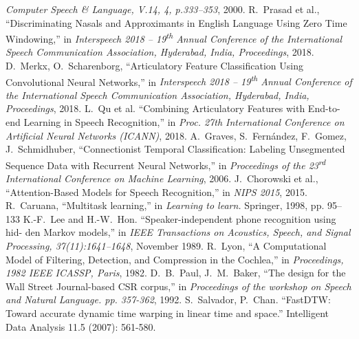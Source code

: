 \documentclass[a4paper]{article}
\begin{document}
\begin{thebibliography}{9}
   \textit{Computer Speech \& Language, V.14, 4, p.333--353}, 2000.
   R.\ Prasad et al.,
   ``Discriminating Nasals and Approximants in English Language Using Zero Time Windowing,''
   in \textit{Interspeech 2018 -- 19\textsuperscript{th} Annual Conference of the International Speech Communication Association, Hyderabad, India, Proceedings}, 2018.
    D.\ Merkx, O.\ Scharenborg,
    ``Articulatory Feature Classification Using Convolutional Neural Networks,''
    in \textit{Interspeech 2018 -- 19\textsuperscript{th} Annual Conference of the International Speech Communication Association, Hyderabad, India, Proceedings}, 2018.
   L.\ Qu et al.
   ``Combining Articulatory Features with End-to-end Learning in Speech Recognition,''
   in \textit{Proc. 27th International Conference on Artificial Neural Networks (ICANN)}, 2018.
   A.\ Graves, S.\ Fernández, F.\ Gomez, J.\ Schmidhuber,
   ``Connectionist Temporal Classification: Labeling Unsegmented Sequence Data with Recurrent Neural Networks,''
   in \textit{Proceedings of the 23\textsuperscript{rd} International Conference on Machine Learning}, 2006.
   J.\ Chorowski et al.,
   ``Attention-Based Models for Speech Recognition,''
   in \textit{NIPS 2015}, 2015.
   R.\ Caruana,
   ``Multitask learning,''
   in \textit{Learning to learn.} Springer, 1998, pp. 95–133
   K.-F.\ Lee and H.-W.\ Hon.
   ``Speaker-independent phone recognition using hid- den Markov models,''
   in \textit{IEEE Transactions on Acoustics, Speech, and Signal Processing, 37(11):1641–1648}, November 1989.
   R.\ Lyon,
   ``A Computational Model of Filtering, Detection, and Compression in the Cochlea,''
   in \textit{Proceedings, 1982 IEEE ICASSP, Paris}, 1982.
   D.\ B.\ Paul, J.\ M.\ Baker,
   ``The design for the Wall Street Journal-based CSR corpus,''
   in \textit{Proceedings of the workshop on Speech and Natural Language. pp. 357-362}, 1992.
   S.\ Salvador, P.\ Chan. ``FastDTW: Toward accurate dynamic time warping in linear time and space.'' Intelligent Data Analysis 11.5 (2007): 561-580.
   
 \end{thebibliography}
\end{document}
